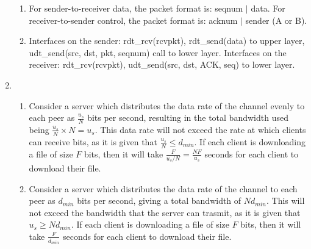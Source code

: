 \documentclass{article}
\begin{document}
\begin{enumerate}
\begin{enumerate}
\item For sender-to-receiver data, the packet format is: seqnum $\vert$ data. For receiver-to-sender control, the packet format is: acknum $\vert$ sender (A or B).
\item Interfaces on the sender: rdt\_rcv(rcvpkt), rdt\_send(data) to upper layer, udt\_send(src, dst, pkt, seqnum) call to lower layer. Interfaces on the receiver: rdt\_rcv(rcvpkt), udt\_send(src, dst, ACK, seq) to lower layer.
\end{enumerate}

\item
\begin{enumerate}
\item Consider a server which distributes the data rate of the channel evenly to each peer as $ \frac{u_s}{N} $ bits per second, resulting in the total bandwidth used being $ \frac{u_s}{N} \times N = u_s $. This data rate will not exceed the rate at which clients can receive bits, as it is given that $ \frac{u_s}{N} \leq d_{min} $. If each client is downloading a file of size $ F $ bits, then it will take $ \frac{F}{u_s/N} = \frac{NF}{u_s} $ seconds for each client to download their file.
\item Consider a server which distributes the data rate of the channel to each peer as $ d_{min} $ bits per second, giving a total bandwidth of $ Nd_{min} $. This will not exceed the bandwidth that the server can trasmit, as it is given that $ u_s \geq Nd_{min} $. If each client is downloading a file of size $ F $ bits, then it will take $ \frac{F}{d_{min}} $ seconds for each client to download their file.
\end{enumerate}

\end{enumerate}
\end{document}
